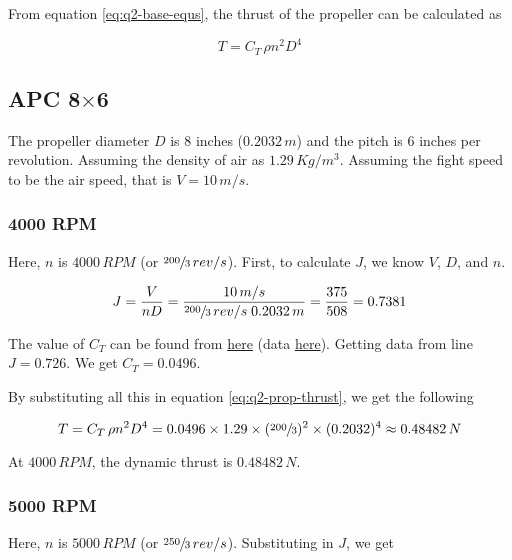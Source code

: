 From equation \ref{eq:q2-base-equs}, the thrust of the propeller can be calculated as

\begin{equation}
    T = C_T \, \rho n^2 D^4
    \label{eq:q2-prop-thrust}
\end{equation}

\subsection{APC 8\texorpdfstring{$\times$}{by}6}

The propeller diameter $D$ is $8$ inches ($0.2032\,m$) and the pitch is $6$ inches per revolution. Assuming the density of air as $1.29\,Kg/m^3$.
Assuming the fight speed to be the air speed, that is $V = 10\,m/s$.

\subsubsection*{4000 RPM}

Here, $n$ is $4000\,RPM$ (or $\sfrac{200}{3}\,rev/s$). First, to calculate $J$, we know $V$, $D$, and $n$.

\begin{equation*}
    J = \frac{V}{nD} = \frac{10\,m/s}{\sfrac{200}{3}\,rev/s \; 0.2032\,m} = \frac{375}{508} = 0.7381
\end{equation*}

The value of $C_T$ can be found from \href{https://m-selig.ae.illinois.edu/props/volume-1/plots/apcsf_8x6_ct.png}{here} (data \href{https://m-selig.ae.illinois.edu/props/volume-1/data/apcsf_8x6_2784rd_4010.txt}{here}). Getting data from line $J = 0.726$. We get $C_T = 0.0496$.

By substituting all this in equation \ref{eq:q2-prop-thrust}, we get the following

\begin{equation*}
    T = C_T \, \rho n^2 D^4 = 0.0496 \times 1.29 \times (\sfrac{200}{3})^2 \times (0.2032)^4 \approx 0.48482\,N
\end{equation*}

At $4000\,RPM$, the dynamic thrust is $0.48482\,N$.

\subsubsection*{5000 RPM}

Here, $n$ is $5000\,RPM$ (or $\sfrac{250}{3}\,rev/s$). Substituting in $J$, we get

